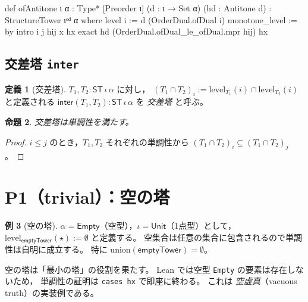 \documentclass[a4paper,11pt]{ltjsarticle}
\theoremstyle{definition}
\newtheorem{definition}{定義}[section]
\newtheorem{example}[definition]{例}
\theoremstyle{plain}
\newtheorem{proposition}[definition]{命題}
\theoremstyle{remark}
\newcommand{\ST}{\mathsf{ST}}    %
\newcommand{\lev}{\mathrm{level}}
\newcommand{\union}{\mathrm{union}}
\begin{document}
\begin{leancode}[caption={ofAntitone の定義（双対順序を活用）}]
def ofAntitone {ι α : Type*} [Preorder ι] (d : ι → Set α) (hd : Antitone d) :
    StructureTower ιᵒᵈ α where
  level i := d (OrderDual.ofDual i)
  monotone_level := by
    intro i j hij x hx
    exact hd (OrderDual.ofDual_le_ofDual.mpr hij) hx
\end{leancode}

\subsection{交差塔 \texttt{inter}}

\begin{definition}[交差塔]\label{def:inter}
$T_1, T_2 : \ST\,\iota\,\alpha$ に対し，
$(T_1 \cap T_2)_i := \lev_{T_1}(i) \cap \lev_{T_2}(i)$
と定義される $\mathsf{inter}(T_1, T_2) : \ST\,\iota\,\alpha$ を \emph{交差塔} と呼ぶ。
\end{definition}

\begin{proposition}
交差塔は単調性を満たす。
\end{proposition}
\begin{proof}
$i \leq j$ のとき，$T_1, T_2$ それぞれの単調性から
$(T_1 \cap T_2)_i \subseteq (T_1 \cap T_2)_j$。
\end{proof}

\section{P1（trivial）：空の塔}\label{sec:empty}

\begin{example}[空の塔]\label{ex:empty}
$\alpha = \mathsf{Empty}$（空型），$\iota = \mathsf{Unit}$（1点型）として，
$\lev_{\mathsf{emptyTower}}(\star) := \emptyset$
と定義する。
空集合は任意の集合に包含されるので単調性は自明に成立する。
特に $\union(\mathsf{emptyTower}) = \emptyset$。
\end{example}

\begin{mathinsight}
空の塔は「最小の塔」の役割を果たす。
Lean では空型 \texttt{Empty} の要素は存在しないため，
単調性の証明は \texttt{cases hx} で即座に終わる。
これは \emph{空虚真}（vacuous truth）の実装例である。
\end{mathinsight}
\end{document}
